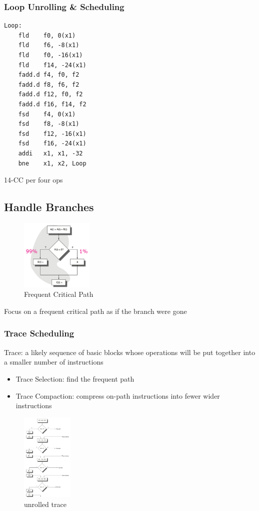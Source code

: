 \subsubsection{Loop Unrolling \& Scheduling}
\begin{verbatim}
Loop:
    fld    f0, 0(x1)
    fld    f6, -8(x1)
    fld    f0, -16(x1)
    fld    f14, -24(x1)
    fadd.d f4, f0, f2
    fadd.d f8, f6, f2
    fadd.d f12, f0, f2
    fadd.d f16, f14, f2
    fsd    f4, 0(x1) 
    fsd    f8, -8(x1)
    fsd    f12, -16(x1)
    fsd    f16, -24(x1)
    addi   x1, x1, -32
    bne    x1, x2, Loop
\end{verbatim}

14-CC per four ops

\subsection{Handle Branches}
\begin{figure}[!htb]
    \centering
    \includegraphics[width=0.309\textwidth]{pic/CA3/Frequent Critical Path}
    \caption{Frequent Critical Path}
\end{figure}
Focus on a frequent critical path as if the branch were gone

\subsubsection{Trace Scheduling}
Trace: a likely sequence of basic
blocks whose operations will be put
together into a smaller number of
instructions

\begin{itemize}
    \item Trace Selection: find the frequent path
    \item Trace Compaction: compress on-path instructions
    into fewer wider instructions
\end{itemize}
\begin{figure}[!htb]
    \centering
    \includegraphics[width=0.22\textwidth]{pic/CA3/unrolled trace}
    \caption{unrolled trace}
\end{figure}

